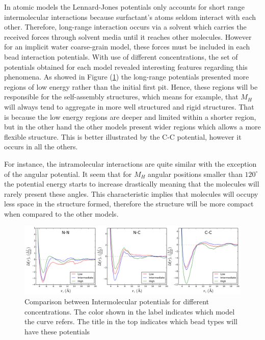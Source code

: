 \documentclass[10pt,a4paper,twoside]{article}
\begin{document}
In atomic models the Lennard-Jones potentials  only accounts for short range intermolecular interactions because surfactant's atoms seldom interact with each other. Therefore, long-range interaction occurs via a solvent which carries the received forces through solvent media until it reaches other molecules. However for an implicit water coarse-grain model, these forces must be included in each bead interaction potentials. With use of different concentrations, the set of potentials obtained for each model revealed interesting features regarding this phenomena. As showed in Figure (\ref{Fig:PotCompInter}) the long-range potentials presented more regions of low energy rather than the initial first pit. Hence, these regions will be responsible for the self-assembly structures, which means for example, that $M_H$ will always tend to aggregate in more well structured and rigid structures. That is because the low energy regions are deeper and limited within a shorter region, but in the other hand the other models present wider regions which allows a more flexible structure. This is better illustrated by the C-C potential, however it occurs in all the others.


For instance, the intramolecular interactions are quite similar with the exception of the angular potential. It seem that for $M_H$ angular positions smaller than $120^{\circ}$ the potential energy starts to increase drastically meaning that the molecules will rarely present these angles. This characteristic implies that molecules will occupy less space in the structure formed, therefore the structure  will be more compact when compared to the other models.

\begin{figure}[H]
  \begin{center}
	\includegraphics[width=1 \textwidth]{./graphs/PotCompInter}
	\caption{Comparison between Intermolecular potentials for different concentrations. The color shown in the label indicates which model the curve refers. The title in the top indicates which bead types will have these potentials}
	\label{Fig:PotCompInter}
  \end{center}
\end{figure} 
\end{document}
